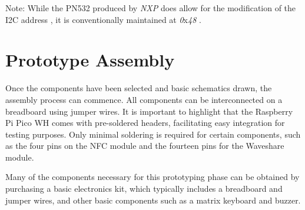Note: While the PN532 produced by \textit{NXP} does allow for the modification of the I2C address \cite{nxp_pn532}, it is 
conventionally maintained at \textit{0}x\textit{48} \cite{i2cdevices_pn532}.

%
%

\section{Prototype Assembly}

Once the components have been selected and basic schematics drawn, the assembly process can commence. All components can be interconnected on a breadboard using jumper wires. It is important to highlight that the Raspberry Pi Pico WH comes with pre-soldered headers, facilitating easy integration for testing purposes. Only minimal soldering is required for certain components, such as the four pins on the NFC module and the fourteen pins for the Waveshare module.

Many of the components necessary for this prototyping phase can be obtained by purchasing a basic electronics kit, which typically includes a breadboard and jumper wires, and other basic components such as a matrix keyboard and buzzer.

